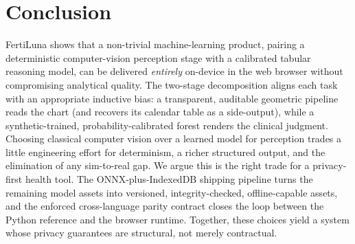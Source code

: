 \documentclass[11pt,a4paper]{article}
\begin{document}
\section{Conclusion}

FertiLuna shows that a non-trivial machine-learning product, pairing a
deterministic computer-vision perception stage with a calibrated tabular
reasoning model, can be delivered \emph{entirely} on-device in the web
browser without compromising analytical quality. The two-stage
decomposition aligns each task with an appropriate inductive bias: a
transparent, auditable geometric pipeline reads the chart (and recovers
its calendar table as a side-output), while a synthetic-trained,
probability-calibrated forest renders the clinical judgment. Choosing
classical computer vision over a learned model for perception trades a
little engineering effort for determinism, a richer structured output,
and the elimination of any sim-to-real gap. We argue this is the right
trade for a privacy-first health tool. The ONNX-plus-IndexedDB shipping
pipeline turns the remaining model assets into versioned,
integrity-checked, offline-capable assets, and the enforced cross-language
parity contract closes the loop between the Python reference and the
browser runtime. Together, these choices yield a system whose privacy
guarantees are structural, not merely contractual.

\printbibliography[heading=bibnumbered,title={References}]
\end{document}
